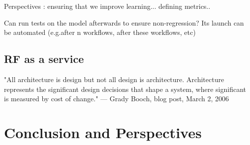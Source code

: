 \documentclass{llncs}
\begin{document}
Perspectives : ensuring that we improve learning... defining metrics..

Can run tests on the model afterwards to ensure non-regression?
Its launch can be automated (e.g.after n workflows, after these workflows, etc)


\subsection{RF as a service}


"All architecture is design but not all design is architecture. Architecture represents the significant design decisions that shape a system, where significant is measured by cost of change."
— Grady Booch, blog post, March 2, 2006


\section{Conclusion and Perspectives}


\end{document}
